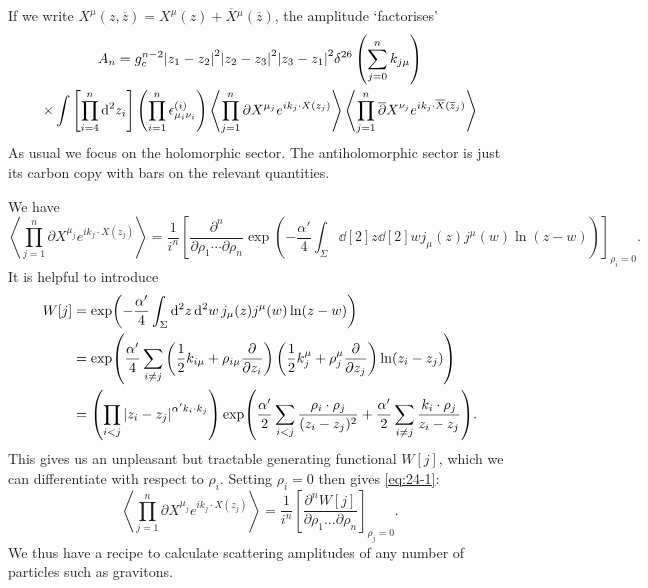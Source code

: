 
If we write $X^{\mu}(z, \overline{z}{}) = X^{\mu}(z) + \overline{X}{}^{\mu}(\overline{z}{})$, the amplitude `factorises'
\begin{multline}
  A_{n} = g_c^{n-2} \abs{z_1 - z_2}^2 \abs{z_2 - z_3}^2 \abs{z_3 - z_1}^2 \delta^{26}\left( \sum_{j=0}^{n} k_{j \mu} \right) \\
  \times \int \left[ \prod_{i=4}^{n} \dd[2]{z_i} \right] \left( \prod_{i=1}^{n} \epsilon^{(i)}_{\mu_i \nu_i} \right) \left\langle \prod_{j=1}^{n} \partial X^{\mu_j} e^{i k_j \cdot X(z_j)} \right\rangle\left\langle \prod_{j=1}^{n} \overline{\partial}{} X^{\nu_j} e^{i k_j \cdot \overline{X}{}(\overline{z}{}_j)} \right\rangle
\end{multline}
As usual we focus on the holomorphic sector. The antiholomorphic sector is just its carbon copy with bars on the relevant quantities.

We have
\begin{equation}
  \label{eq:24-1}
  \left\langle \prod_{j=1}^{n} \partial X^{\mu_j} e^{i k_j \cdot X(z_j)} \right\rangle = \frac{1}{i^n} \left[ \frac{\partial^n}{\partial \rho_1 \cdots \partial \rho_n} \exp(-\frac{\alpha'}{4} \int_{\Sigma} \dd[2]{z} \dd[2]{w} j_{\mu}(z) j^{\mu}(w) \ln(z - w)) \right]_{\rho_i = 0}.
\end{equation}
It is helpful to introduce
\begin{align}
  W[j] &= \exp(-\frac{\alpha'}{4} \int_{\Sigma} \dd[2]{z} \dd[2]{w} j_{\mu}(z) j^{\mu}(w) \ln(z - w)) \\
       &= \exp(\frac{\alpha'}{4} \sum_{i \neq j} \left( \frac{1}{2} k_{i \mu} + \rho_{i \mu} \frac{\partial }{\partial z_i} \right)\left( \frac{1}{2} k_{j}^{\mu} + \rho_{j}^{\mu} \frac{\partial }{\partial z_j} \right) \ln(z_i - z_j)) \\
       &= \left( \prod_{i < j} \abs{z_i - z_j}^{\alpha' k_i \cdot k_j} \right) \exp( \frac{\alpha'}{2} \sum_{i < j} \frac{\rho_i \cdot \rho_j}{(z_i - z_j)^2} + \frac{\alpha'}{2} \sum_{i \neq j} \frac{k_i \cdot \rho_j}{z_i - z_j}).
       \label{eq:24-2}
\end{align}
This gives us an unpleasant but tractable generating functional $W[j]$, which we can differentiate with respect to $\rho_i$. Setting $\rho_i =0$ then gives \eqref{eq:24-1}:
\begin{equation}
  \left\langle \prod_{j=1}^{n} \partial X^{\mu_j} e^{i k_j \cdot X(z_j)} \right\rangle = \frac{1}{i^n} \left[ \frac{\partial^n W[j]}{\partial \rho_1 \dots \partial \rho_n} \right]_{\rho_j =0}.
\end{equation}
We thus have a recipe to calculate scattering amplitudes of any number of particles such as gravitons.

